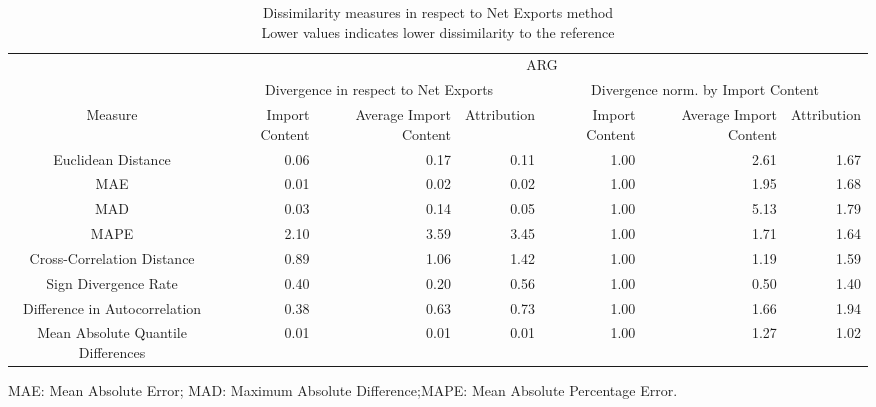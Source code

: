 \begin{table}[t]
\caption*{
{\large Dissimilarity measures in respect to Net Exports method} \\ 
{\small Lower values indicates lower dissimilarity to the reference}
} 
\fontsize{15.0pt}{18.0pt}\selectfont
\begin{tabular*}{\linewidth}{@{\extracolsep{\fill}}crrrrrr}
\toprule
 & \multicolumn{6}{c}{ARG} \\ 
\cmidrule(lr){2-7}
 & \multicolumn{3}{c}{Divergence in respect to Net Exports} & \multicolumn{3}{c}{Divergence norm. by Import Content} \\ 
\cmidrule(lr){2-4} \cmidrule(lr){5-7}
Measure & Import Content & Average Import Content & Attribution & Import Content & Average Import Content & Attribution \\ 
\midrule\addlinespace[2.5pt]
Euclidean Distance & 0.06 & 0.17 & 0.11 & 1.00 & 2.61 & 1.67 \\ 
MAE & 0.01 & 0.02 & 0.02 & 1.00 & 1.95 & 1.68 \\ 
MAD & 0.03 & 0.14 & 0.05 & 1.00 & 5.13 & 1.79 \\ 
MAPE & 2.10 & 3.59 & 3.45 & 1.00 & 1.71 & 1.64 \\ 
Cross-Correlation Distance & 0.89 & 1.06 & 1.42 & 1.00 & 1.19 & 1.59 \\ 
Sign Divergence Rate & 0.40 & 0.20 & 0.56 & 1.00 & 0.50 & 1.40 \\ 
Difference in Autocorrelation & 0.38 & 0.63 & 0.73 & 1.00 & 1.66 & 1.94 \\ 
Mean Absolute Quantile Differences & 0.01 & 0.01 & 0.01 & 1.00 & 1.27 & 1.02 \\ 
\bottomrule
\end{tabular*}
\begin{minipage}{\linewidth}
MAE: Mean Absolute Error; MAD: Maximum Absolute Difference;MAPE: Mean Absolute Percentage Error.\\
\end{minipage}
\end{table}


